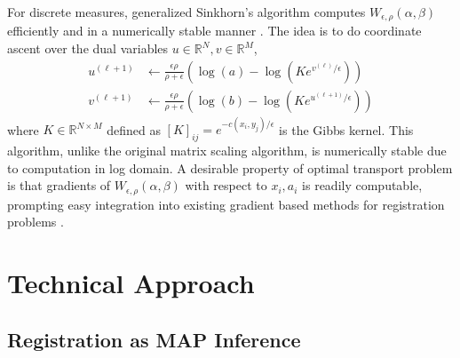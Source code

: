 \documentclass{6838publ}
\newcommand\R{\ensuremath{\mathbb{R}}} %
\newcommand\pb[1]{\ensuremath{\left[ #1 \right]}} %
\begin{document}
For discrete measures, generalized Sinkhorn's algorithm computes $W_{\epsilon,\rho}(\alpha,\beta)$ efficiently and in a numerically stable manner \cite{chizatScalingAlgorithmsUnbalanced2017,feydyInterpolatingOptimalTransport2018}. The idea is to do coordinate ascent over the dual variables $u\in\R^N,v\in\R^M$,
\begin{align}
    u^{(\ell+1)}
        &\leftarrow \frac{\epsilon\rho}{\rho+\epsilon} \left( \log(a) - \log(Ke^{v^{(\ell)}/\epsilon}) \right) \\
    v^{(\ell+1)}
        &\leftarrow \frac{\epsilon\rho}{\rho+\epsilon} \left( \log(b) - \log(Ke^{u^{(\ell+1)}/\epsilon}) \right)
    \label{eq:sinkhorn_dual_ascent}
\end{align}
where $K\in\R^{N\times M}$ defined as $\pb{K}_{ij} = e^{-c(x_i,y_j)/\epsilon}$ is the Gibbs kernel. This algorithm, unlike the original matrix scaling algorithm, is numerically stable due to computation in log domain. A desirable property of optimal transport problem is that gradients of $W_{\epsilon,\rho}(\alpha,\beta)$ with respect to $x_i,a_i$ is readily computable, prompting easy integration into existing gradient based methods for registration problems \cite{feydyOptimalTransportDiffeomorphic2017a}. 


\section{Technical Approach}\label{sec:technical_approach}

\subsection{Registration as MAP Inference}
\end{document}

